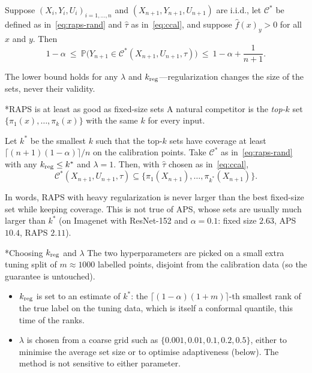 \documentclass[11pt]{article}
\makeatletter
\theoremstyle{definition}
\renewcommand\subsection{\@startsection{subsection}{2}{\z@}{-3.25ex\@plus -1ex \@minus -.2ex}{1.5ex \@plus .2ex}{\normalfont\large\bfseries\color{secblue}}}
\newcommand{\C}{\mathcal{C}}
\newcommand{\fhat}{\hat{f}}
\newcommand{\PP}{\mathbb{P}}
\newcommand{\kreg}{k_{\rm reg}}
\makeatother
\begin{document}
\begin{proposition}\label{prop:raps}
Suppose $(X_i,Y_i,U_i)_{i=1,\dots,n}$ and $(X_{n+1},Y_{n+1},U_{n+1})$ are i.i.d., let $\C^*$ be defined as in~\eqref{eq:raps-rand} and $\hat\tau$ as in~\eqref{eq:ccal}, and suppose $\fhat(x)_y>0$ for all $x$ and $y$. Then
\[1-\alpha\ \le\ \PP\big(Y_{n+1}\in\C^*(X_{n+1},U_{n+1},\hat\tau)\big)\ \le\ 1-\alpha+\frac{1}{n+1}.\]
\end{proposition}
The lower bound holds for any $\lambda$ and $\kreg$---regularization changes the size of the sets, never their validity.

\subsection*{RAPS is at least as good as fixed-size sets}
A natural competitor is the \emph{top-$k$} set $\{\pi_1(x),\dots,\pi_k(x)\}$ with the same $k$ for every input.
\begin{proposition}\label{prop:topk}
Let $k^*$ be the smallest $k$ such that the top-$k$ sets have coverage at least $\lceil(n+1)(1-\alpha)\rceil/n$ on the calibration points. Take $\C^*$ as in~\eqref{eq:raps-rand} with any $\kreg\le k^*$ and $\lambda=1$. Then, with $\hat\tau$ chosen as in~\eqref{eq:ccal},
\[\C^*(X_{n+1},U_{n+1},\hat\tau)\subseteq\{\pi_1(X_{n+1}),\dots,\pi_{k^*}(X_{n+1})\}.\]
\end{proposition}
In words, RAPS with heavy regularization is never larger than the best fixed-size set while keeping coverage. This is not true of APS, whose sets are usually much larger than $k^*$ (on Imagenet with ResNet-152 and $\alpha=0.1$: fixed size $2.63$, APS $10.4$, RAPS $2.11$).

\subsection*{Choosing $\kreg$ and $\lambda$}
The two hyperparameters are picked on a small extra tuning split of $m\approx1000$ labelled points, disjoint from the calibration data (so the guarantee is untouched).
\begin{itemize}[leftmargin=1.5em]
\item $\kreg$ is set to an estimate of $k^*$: the $\lceil(1-\alpha)(1+m)\rceil$-th smallest rank of the true label on the tuning data, which is itself a conformal quantile, this time of the ranks.
\item $\lambda$ is chosen from a coarse grid such as $\{0.001,0.01,0.1,0.2,0.5\}$, either to minimise the average set size or to optimise adaptiveness (below). The method is not sensitive to either parameter.
\end{itemize}
\end{document}
